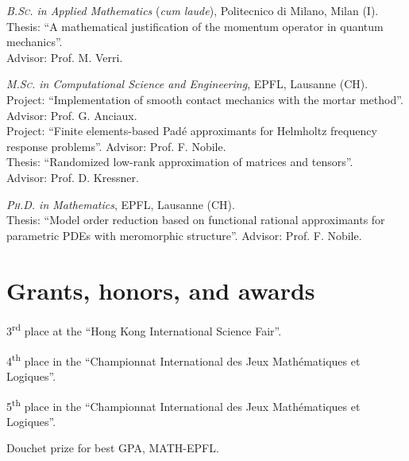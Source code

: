 \documentclass[11pt]{article} %
\begin{document}
\hspace{\parindent}\emph{\textsc{B.Sc.} in Applied Mathematics} (\emph{cum laude}), Politecnico di Milano, Milan (I).\\
Thesis: ``A mathematical justification of the momentum operator in quantum mechanics''.\\
\phantom{m}\hfill Advisor: Prof. M. Verri.

\emph{\textsc{M.Sc.} in Computational Science and Engineering}, EPFL, Lausanne (CH).\\
Project: ``Implementation of smooth contact mechanics with the mortar method''.\\
\phantom{m}\hfill Advisor: Prof. G. Anciaux.\\
Project: ``Finite elements-based Pad\'e approximants for Helmholtz frequency response problems''.\hspace{9em}\phantom{m} \hfill Advisor: Prof. F. Nobile.\\
Thesis: ``Randomized low-rank approximation of matrices and tensors''.\\
\phantom{m}\hfill Advisor: Prof. D. Kressner.

\emph{\textsc{Ph.D.} in Mathematics}, EPFL, Lausanne (CH).\\
Thesis: ``Model order reduction based on functional rational approximants for parametric PDEs with meromorphic structure''.\hspace{9em}\phantom{m} \hfill Advisor: Prof. F. Nobile.


\section*{Grants, honors, and awards}

\hspace{\parindent}3\textsuperscript{rd} place at the ``Hong Kong International Science Fair''.

4\textsuperscript{th} place in the ``Championnat International des Jeux Math\'ematiques et Logiques''.

5\textsuperscript{th} place in the ``Championnat International des Jeux Math\'ematiques et Logiques''.

Douchet prize for best GPA, MATH-EPFL.
\end{document}
